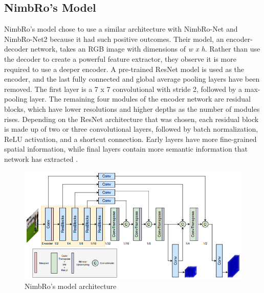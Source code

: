 \subsection{NimbRo's Model}
\label{subsec:nimbromodel}

NimbRo's model chose to use a similar architecture with NimbRo-Net and NimbRo-Net2 because it had such positive outcomes.
Their model, an encoder-decoder network, takes an RGB image with dimensions of \emph{w x h}. Rather than use the decoder to create a powerful feature extractor, they observe it is more required to use a deeper encoder.
A pre-trained ResNet model \parencite{he2016} is used as the encoder, and the last fully connected and global average pooling layers have been removed.
The first layer is a 7 x 7 convolutional with stride 2, followed by a max-pooling layer.  The remaining four modules of the encoder network are residual blocks, which have lower resolutions and higher depths as the number of modules rises.
Depending on the ResNet architecture that was chosen, each residual block is made up of two or three convolutional layers, followed by batch normalization, ReLU activation, and a shortcut connection. Early layers have more fine-grained spatial information,
while final layers contain more semantic information that network has extracted \parencite{amini2021}.

\begin{figure}[ht]
  \centering
  \includegraphics[scale=0.9]{gambar/nimbro-architecture.png}
  \caption{NimbRo's model architecture}
  \label{fig:nimbro-model-architecture}
\end{figure}


